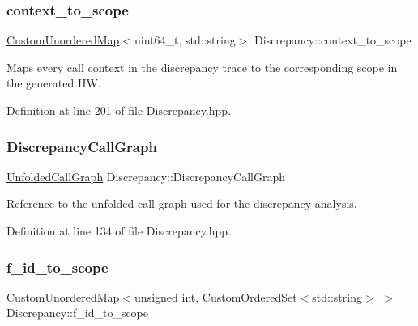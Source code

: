\subsubsection{\texorpdfstring{context\+\_\+to\+\_\+scope}{context\_to\_scope}}
{\footnotesize\ttfamily \hyperlink{custom__map_8hpp_ad1ed68f2ff093683ab1a33522b144adc}{Custom\+Unordered\+Map}$<$uint64\+\_\+t, std\+::string$>$ Discrepancy\+::context\+\_\+to\+\_\+scope}



Maps every call context in the discrepancy trace to the corresponding scope in the generated HW. 



Definition at line 201 of file Discrepancy.\+hpp.

\mbox{\label{structDiscrepancy_a95678490e9b1083fc917b21c9adaaca2}} 
\subsubsection{\texorpdfstring{Discrepancy\+Call\+Graph}{DiscrepancyCallGraph}}
{\footnotesize\ttfamily \hyperlink{classUnfoldedCallGraph}{Unfolded\+Call\+Graph} Discrepancy\+::\+Discrepancy\+Call\+Graph}



Reference to the unfolded call graph used for the discrepancy analysis. 



Definition at line 134 of file Discrepancy.\+hpp.

\mbox{\label{structDiscrepancy_a4f56a1d98d80c8f3294e01c5c2c1cc85}} 
\subsubsection{\texorpdfstring{f\+\_\+id\+\_\+to\+\_\+scope}{f\_id\_to\_scope}}
{\footnotesize\ttfamily \hyperlink{custom__map_8hpp_ad1ed68f2ff093683ab1a33522b144adc}{Custom\+Unordered\+Map}$<$unsigned int, \hyperlink{classCustomOrderedSet}{Custom\+Ordered\+Set}$<$std\+::string$>$ $>$ Discrepancy\+::f\+\_\+id\+\_\+to\+\_\+scope}




